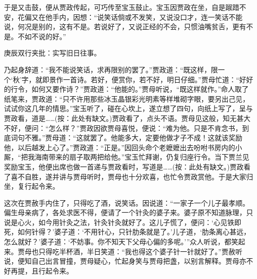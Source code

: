\begin{parag}
    于是又击鼓，便从贾政传起，可巧传至宝玉鼓止。宝玉因贾政在坐，自是踧踖不安，花偏又在他手内，因想：“说笑话倘或不发笑，又说没口才，连一笑话不能说，何况是别的，这有不是。若说好了，又说正经的不会，只惯油嘴贫舌，更有不是。不如不说的好。”\begin{note}庚辰双行夹批：实写旧日往事。\end{note}乃起身辞道：“我不能说笑话，求再限别的罢了。”贾政道：“既这样，限一个‘秋’字，就即景作一首诗。若好，便赏你，若不好，明日仔细。”贾母忙道：“好好的行令，如何又要作诗？”贾政道：“他能的。”贾母听说，“既这样就作。”命人取了纸笔来，贾政道：“只不许用那些冰玉晶银彩光明素等样堆砌字眼，要另出己见，试试你这几年的情思。”宝玉听了，碰在心坎上，遂立想了四句，向纸上写了，呈与贾政看，道是……(按：此处有缺文。)贾政看了，点头不语。贾母见这般，知无甚大不好，便问：“怎么样？”贾政因欲贾母喜悦，便说：“难为他。只是不肯念书，到底词句不雅。”贾母道：“这就罢了。他能多大，定要他做才子不成！这就该奖励他，以后越发上心了。”贾政道：“正是。”因回头命个老嬷嬷出去吩咐书房内的小厮，“把我海南带来的扇子取两把给他。”宝玉忙拜谢，仍复归座行令。当下贾兰见奖励宝玉，他便出席也做一首递与贾政看时，写道是……(按：此处有缺文。)贾政看了喜不自胜，遂并讲与贾母听时，贾母也十分欢喜，也忙令贾政赏他。于是大家归坐，复行起令来。
\end{parag}


\begin{parag}
    这次在贾赦手内住了，只得吃了酒，说笑话。因说道：“一家子一个儿子最孝顺。偏生母亲病了，各处求医不得，便请了一个针灸的婆子来。婆子原不知道脉理，只说是心火，如今用针灸之法，针灸针灸就好了。这儿子慌了，便问：‘心见铁即死，如何针得？’婆子道：‘不用针心，只针肋条就是了。’儿子道，‘肋条离心甚远，怎么就好？’婆子道：‘不妨事。你不知天下父母心偏的多呢。’”众人听说，都笑起来。贾母也只得吃半杯酒，半日笑道：“我也得这个婆子针一针就好了。”贾赦听说，便知自己出言冒撞，贾母疑心，忙起身笑与贾母把盏，以别言解释。贾母亦不好再提，且行起令来。
\end{parag}


